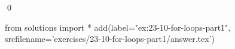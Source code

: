 
\begin{ex}
  \label{ex:23-10-for-loops-part1}
  
  \qed
\end{ex}
\begin{python0}
from solutions import *
add(label="ex:23-10-for-loops-part1",
    srcfilename='exercises/23-10-for-loops-part1/answer.tex')
\end{python0}
